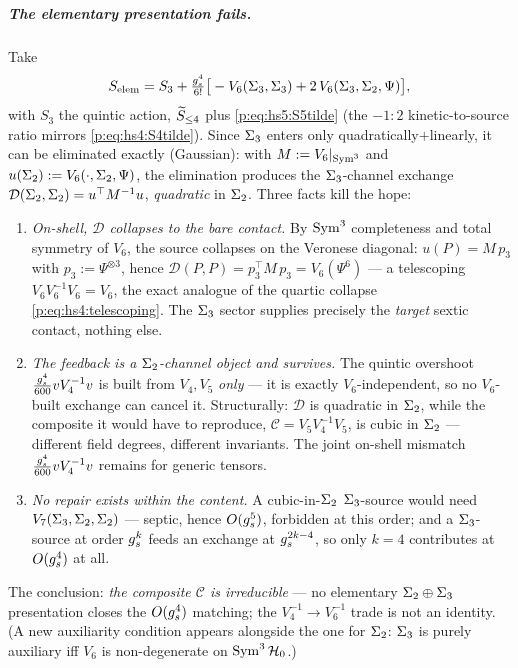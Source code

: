 \subparagraph{The elementary presentation fails.} Take
\begin{equation}
	S_{\rm elem}
	= S_3
	+ \tfrac{\gs^4}{6!}\big[-V_6(\Sig_3,\Sig_3)+2\,V_6(\Sig_3,\Sig_2,\Psi)\big],
	\label{ped:eq:Selem}
\end{equation}
with $S_3$ the quintic action, $\caction[\le 4]$ plus \eqref{p:eq:hs5:S5tilde} (the $-1{:}2$ kinetic-to-source ratio mirrors
\eqref{p:eq:hs4:S4tilde}). Since $\Sig_3$ enters only quadratically$+$linearly, it can be eliminated
exactly (Gaussian): with $M:=V_6|_{\Sym^3}$ and $u(\Sig_2):=V_6(\cdot,\Sig_2,\Psi)$, the
elimination produces the $\Sig_3$-channel exchange
$\mathcal D(\Sig_2,\Sig_2)=u^\top M^{-1}u$, \emph{quadratic} in $\Sig_2$. Three facts kill
the hope:
\begin{enumerate}[label=(\roman*),leftmargin=*]
	\setlength{\itemsep}{0.4ex}
	\item \emph{On-shell, $\mathcal D$ collapses to the bare contact.} By $\Sym^3$
	completeness and total symmetry of $V_6$, the source collapses on the Veronese diagonal:
	$u(P)=M\,p_3$ with $p_3:=\Psi^{\otimes3}$, hence
	$\mathcal D(P,P)=p_3^\top M\,p_3=V_6(\Psi^6)$ --- a telescoping $V_6V_6^{-1}V_6=V_6$,
	the exact analogue of the quartic collapse \eqref{p:eq:hs4:telescoping}. The $\Sig_3$ sector supplies precisely the
	\emph{target} sextic contact, nothing else.
	\item \emph{The feedback is a $\Sig_2$-channel object and survives.} The quintic
	overshoot $\tfrac{\gs^4}{600}vV_4^{-1}v$ is built from $V_4,V_5$ \emph{only} --- it is
	exactly $V_6$-independent, so no $V_6$-built exchange can cancel it. Structurally:
	$\mathcal D$ is quadratic in $\Sig_2$, while the composite it would have to reproduce,
	$\mathcal C=V_5V_4^{-1}V_5$, is cubic in $\Sig_2$ --- different field degrees, different
	invariants. The joint on-shell mismatch $\tfrac{\gs^4}{600}vV_4^{-1}v$ remains for
	generic tensors.
	\item \emph{No repair exists within the content.} A cubic-in-$\Sig_2$ $\Sig_3$-source
	would need $V_7(\Sig_3,\Sig_2,\Sig_2)$ --- septic, hence $O(\gs^5)$, forbidden at this
	order; and a $\Sig_3$-source at order $\gs^k$ feeds an exchange at $\gs^{2k-4}$, so only
	$k=4$ contributes at $O(\gs^4)$ at all.
\end{enumerate}
The conclusion: \emph{the composite $\mathcal C$ is
irreducible} --- no elementary $\Sig_2\oplus\Sig_3$ presentation closes the $O(\gs^4)$
matching; the $V_4^{-1}\to V_6^{-1}$ trade is not an identity. (A new auxiliarity condition
appears alongside the one for $\Sig_2$: $\Sig_3$ is purely auxiliary iff $V_6$ is non-degenerate
on $\Sym^3\Hilb_0$.)

